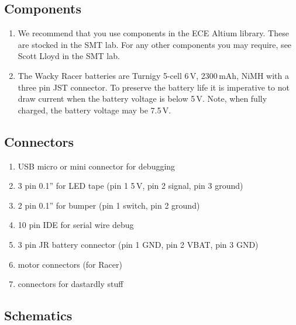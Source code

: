 \documentclass[11pt, a4paper]{article}
\begin{document}
\subsection{Components}

\begin{enumerate}
\item We recommend that you use components in the ECE Altium library.
  These are stocked in the SMT lab.  For any other components you may
  require, see Scott Lloyd in the SMT lab.

\item The Wacky Racer batteries are Turnigy 5-cell 6\,V, 2300\,mAh,
  NiMH with a three pin JST connector.  To preserve the battery life
  it is imperative to not draw current when the battery voltage is
  below 5\,V.  Note, when fully charged, the battery voltage may be 7.5\,V.
\end{enumerate}


\subsection{Connectors}

\begin{enumerate}
\item USB micro or mini connector for debugging
\item 3 pin 0.1'' for LED tape (pin 1 5\,V, pin 2 signal, pin 3 ground)
\item 2 pin 0.1'' for bumper (pin 1 switch, pin 2 ground)
\item 10 pin IDE for serial wire debug
\item 3 pin JR battery connector (pin 1 GND, pin 2 VBAT, pin 3 GND)
\item motor connectors (for Racer)
\item connectors for dastardly stuff
\end{enumerate}


\subsection{Schematics}
\end{document}
